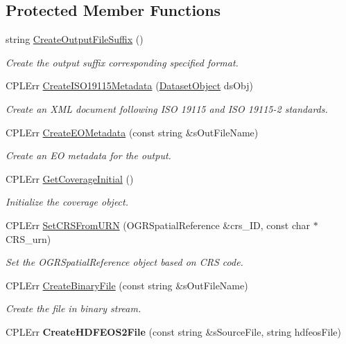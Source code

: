 \subsection*{Protected Member Functions}
\begin{DoxyCompactItemize}
\item 
string \hyperlink{classWCS__GetCoverage_af70345de7d0cd908c28d9008d73569bf}{CreateOutputFileSuffix} ()
\begin{DoxyCompactList}\small\item\em Create the output suffix corresponding specified format. \end{DoxyCompactList}\item 
CPLErr \hyperlink{classWCS__GetCoverage_a0b4bdb2cf27cf85bea24529215daa372}{CreateISO19115Metadata} (\hyperlink{classDatasetObject}{DatasetObject} dsObj)
\begin{DoxyCompactList}\small\item\em Create an XML document following ISO 19115 and ISO 19115-\/2 standards. \end{DoxyCompactList}\item 
CPLErr \hyperlink{classWCS__GetCoverage_a1ef04fe1f8036a6347167b05eaaaa674}{CreateEOMetadata} (const string \&sOutFileName)
\begin{DoxyCompactList}\small\item\em Create an EO metadata for the output. \end{DoxyCompactList}\item 
CPLErr \hyperlink{classWCS__GetCoverage_a2b1cb91bae3d6cd3098d74ac666d557d}{GetCoverageInitial} ()
\begin{DoxyCompactList}\small\item\em Initialize the coverage object. \end{DoxyCompactList}\item 
CPLErr \hyperlink{classWCS__GetCoverage_a907d391b5e85ec4d3ca17316f69d3be0}{SetCRSFromURN} (OGRSpatialReference \&crs\_\-ID, const char $\ast$CRS\_\-urn)
\begin{DoxyCompactList}\small\item\em Set the OGRSpatialReference object based on CRS code. \end{DoxyCompactList}\item 
CPLErr \hyperlink{classWCS__GetCoverage_af624f4a8cac34ccd1bd16bbd67a685be}{CreateBinaryFile} (const string \&sOutFileName)
\begin{DoxyCompactList}\small\item\em Create the file in binary stream. \end{DoxyCompactList}\item 
\hypertarget{classWCS__GetCoverage_af3b045ddefc1f5859e85234674a4b813}{
CPLErr {\bfseries CreateHDFEOS2File} (const string \&sSourceFile, string hdfeosFile)}
\label{classWCS__GetCoverage_af3b045ddefc1f5859e85234674a4b813}


\end{DoxyCompactItemize}
